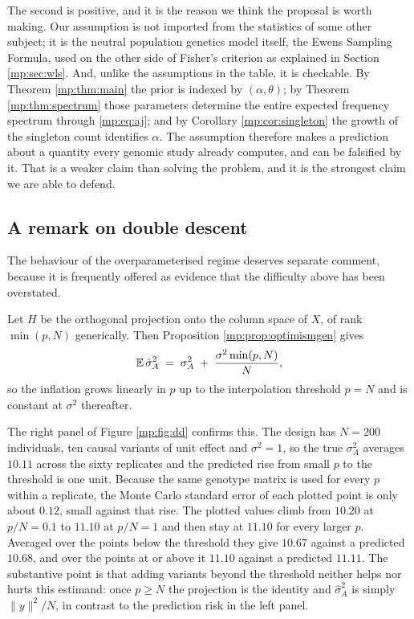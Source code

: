 The second is positive, and it is the reason we think the proposal is worth making. Our
assumption is not imported from the statistics of some other subject; it is the neutral
population genetics model itself, the Ewens Sampling Formula, used on the other side of
Fisher's criterion as explained in Section \ref{mp:sec:wls}. And, unlike the assumptions in the
table, it is checkable. By Theorem \ref{mp:thm:main} the prior is indexed by $(\alpha,\theta)$;
by Theorem \ref{mp:thm:spectrum} those parameters determine the entire expected frequency
spectrum through \eqref{mp:eq:aj}; and by Corollary \ref{mp:cor:singleton} the growth of the
singleton count identifies $\alpha$. The assumption therefore makes a prediction about a
quantity every genomic study already computes, and can be falsified by it. That is a weaker
claim than solving the problem, and it is the strongest claim we are able to defend.

\subsection{A remark on double descent}
\label{mp:sec:dd}

The behaviour of the overparameterised regime deserves separate comment, because it is
frequently offered as evidence that the difficulty above has been overstated.

\begin{corollary}
\label{mp:cor:saturate}
Let $H$ be the orthogonal projection onto the column space of $X$, of rank
$\min(p,N)$ generically. Then Proposition \ref{mp:prop:optimismgen} gives
\[
\mathbb{E}\,\hat\sigma_A^2 \;=\; \sigma_A^2 \;+\; \frac{\sigma^2\min(p,N)}{N},
\]
so the inflation grows linearly in $p$ up to the interpolation threshold $p=N$ and is
constant at $\sigma^2$ thereafter.
\end{corollary}

The right panel of Figure \ref{mp:fig:dd} confirms this. The design has $N=200$ individuals,
ten causal variants of unit effect and $\sigma^2=1$, so the true $\sigma_A^2$ averages $10.11$
across the sixty replicates and the predicted rise from small $p$ to the threshold is one
unit. Because the same genotype matrix is used for every $p$ within a replicate, the Monte
Carlo standard error of each plotted point is only about $0.12$, small against that rise.
The plotted values climb from $10.20$ at $p/N=0.1$ to $11.10$ at $p/N=1$ and then stay at
$11.10$ for every larger $p$. Averaged over the points below the threshold they give $10.67$
against a predicted $10.68$, and over the points at or above it $11.10$ against a predicted
$11.11$. The substantive point is that adding variants beyond the threshold neither helps nor
hurts this estimand: once $p\ge N$ the projection is the identity and $\hat\sigma_A^2$ is
simply $\|y\|^2/N$, in contrast to the prediction risk in the left panel.

